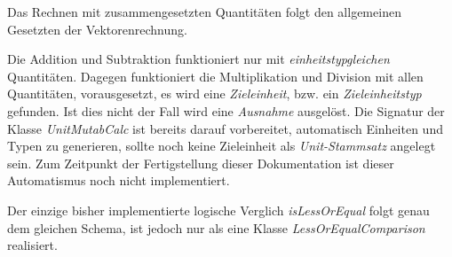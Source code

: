 Das Rechnen mit zusammengesetzten Quantitäten folgt den allgemeinen Gesetzten der Vektorenrechnung.

Die Addition und Subtraktion funktioniert nur mit \emph{einheitstypgleichen} Quantitäten. Dagegen funktioniert die Multiplikation und Division mit allen Quantitäten, vorausgesetzt, es wird eine \emph{Zieleinheit}, bzw. ein \emph{Zieleinheitstyp} gefunden. Ist dies nicht der Fall wird eine \emph{Ausnahme} ausgelöst. Die Signatur der Klasse 
\textit{UnitMutabCalc} ist bereits darauf vorbereitet, automatisch Einheiten und Typen zu generieren, sollte noch keine Zieleinheit als \emph{Unit-Stammsatz} angelegt sein. Zum Zeitpunkt der Fertigstellung dieser Dokumentation ist dieser Automatismus noch nicht implementiert.

Der einzige bisher implementierte logische Verglich \emph{isLessOrEqual} folgt genau dem gleichen Schema, ist jedoch nur als eine Klasse \textit{LessOrEqualComparison} realisiert.
